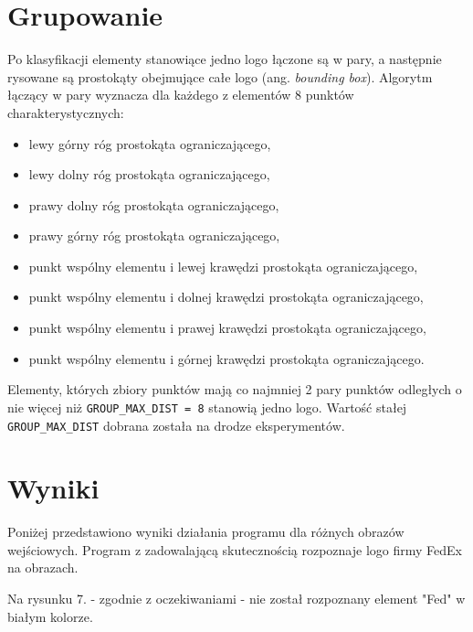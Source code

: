 \documentclass[12pt, oneside, final]{report}
\begin{document}
\section*{Grupowanie}
Po klasyfikacji elementy stanowiące jedno logo łączone są w pary, a następnie rysowane są prostokąty obejmujące całe logo (ang. \textit{bounding box}). Algorytm łączący w pary wyznacza dla każdego z elementów 8 punktów charakterystycznych:
\begin{itemize}
	\item lewy górny róg prostokąta ograniczającego,
	\item lewy dolny róg prostokąta ograniczającego,
	\item prawy dolny róg prostokąta ograniczającego,
	\item prawy górny róg prostokąta ograniczającego,
	\item punkt wspólny elementu i lewej krawędzi prostokąta ograniczającego,
	\item punkt wspólny elementu i dolnej krawędzi prostokąta ograniczającego,
	\item punkt wspólny elementu i prawej krawędzi prostokąta ograniczającego,
	\item punkt wspólny elementu i górnej krawędzi prostokąta ograniczającego.
\end{itemize}
Elementy, których zbiory punktów mają co najmniej 2 pary punktów odległych o nie więcej niż \texttt{GROUP\_MAX\_DIST = 8} stanowią jedno logo. Wartość stałej \texttt{GROUP\_MAX\_DIST} dobrana została na drodze eksperymentów.

\section*{Wyniki}
Poniżej przedstawiono wyniki działania programu dla różnych obrazów wejściowych. Program z zadowalającą skutecznością rozpoznaje logo firmy FedEx na obrazach.

Na rysunku 7. - zgodnie z oczekiwaniami - nie został rozpoznany element "Fed" w białym kolorze.
\end{document}

